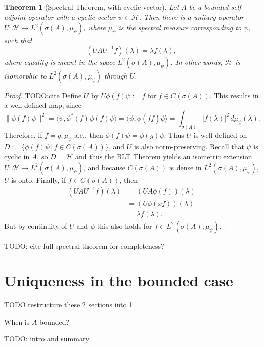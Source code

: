 \documentclass[12pt,oneside]{report}
\newtheorem{thm}{Theorem}[chapter]
\begin{document}
\begin{thm}[Spectral Theorem, with cyclic vector]\label{spectral-mo}
    Let $A$ be a bounded self-adjoint operator with a cyclic vector $\psi \in \mathscr{H}$. Then there is a unitary operator $U: \mathscr{H} \to L^{2}(\sigma(A),\mu_{\psi})$, where $\mu_{\psi}$ is the spectral measure corresponding to $\psi$, such that $$(UAU^{-1}f)(\lambda) = \lambda f(\lambda),$$where equality is meant in the space $L^{2}(\sigma(A),\mu_{\psi})$. In other words, $\mathscr{H}$ is isomorphic to $L^2(\sigma(A),\mu_\psi)$ through $U$.
\end{thm}
\begin{proof}
    TODO:cite Define $U$ by $U\phi(f)\psi := f$ for $f \in C(\sigma(A))$. This results in a well-defined map, since $$\|\phi(f)\psi\|^{2} = \langle \psi, \phi^{*}(f)\phi(f)\psi \rangle = \langle \psi, \phi(\overline{f}f)\psi \rangle = \int _{\sigma(A)} |f(\lambda)|^{2} \, d\mu_{\psi}(\lambda).$$ Therefore, if $f=g, \mu_{\psi}$-a.e., then $\phi(f)\psi = \phi(g)\psi$. Thus $U$ is well-defined on $D := \{ \phi(f)\psi \, | \, f \in C(\sigma(A)) \}$, and $U$ is also norm-preserving. Recall that $\psi$ is cyclic in $A$, so $\overline{D} = \mathscr{H}$ and thus the BLT Theorem yields an isometric extension $U: \mathscr{H} \to L^{2}(\sigma(A), \mu_{\psi})$, and because $C(\sigma(A))$ is dense in $L^{2}(\sigma(A),\mu_{\psi})$, $U$ is onto. Finally, if $f \in C(\sigma(A))$, then \begin{align*}
        (UAU^{-1}f)(\lambda) &= (UA\phi(f))(\lambda) \\
        &= (U\phi(xf))(\lambda) \\
        &= \lambda f(\lambda).
    \end{align*} But by continuity of $U$ and $\phi$ this also holds for $f \in L^{2}(\sigma(A),\mu_{\psi})$.
\end{proof}

TODO: cite full spectral theorem for completeness?

\chapter{Uniqueness in the bounded case}

TODO restructure these 2 sections into 1

 When is $A$ bounded?

TODO: intro and summary
\end{document}

